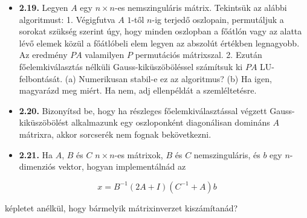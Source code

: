 \documentclass[
  magyar,
  11pt]{article}
\providecommand{\tightlist}{%
  \setlength{\itemsep}{0pt}\setlength{\parskip}{0pt}}
\begin{document}
\begin{itemize}
\tightlist
\item
  \textbf{2.19.} Legyen \(A\) egy \(n \times n\)-es nemszinguláris
  mátrix. Tekintsük az alábbi algoritmust: 1. Végigfutva \(A\) \(1\)-től
  \(n\)-ig terjedő oszlopain, permutáljuk a sorokat szükség szerint úgy,
  hogy minden oszlopban a főátlón vagy az alatta lévő elemek közül a
  főátlóbeli elem legyen az abszolút értékben legnagyobb. Az eredmény
  \(PA\) valamilyen \(P\) permutációs mátrixszal. 2. Ezután
  főelemkiválasztás nélküli Gauss-kiküszöböléssel számítsuk ki \(PA\)
  LU-felbontását. (a) Numerikusan stabil-e ez az algoritmus? (b) Ha
  igen, magyarázd meg miért. Ha nem, adj ellenpéldát a szemléltetésre.
\item
  \textbf{2.20.} Bizonyítsd be, hogy ha részleges főelemkiválasztással
  végzett Gauss-kiküszöbölést alkalmazunk egy oszloponként diagonálisan
  domináns \(A\) mátrixra, akkor sorcserék nem fognak bekövetkezni.
\item
  \textbf{2.21.} Ha \(A\), \(B\) és \(C\) \(n \times n\)-es mátrixok,
  \(B\) és \(C\) nemszinguláris, és \(b\) egy \(n\)-dimenziós vektor,
  hogyan implementálnád az
\end{itemize}

\[x = B^{-1}(2A + I)(C^{-1} + A)b\]

képletet anélkül, hogy bármelyik mátrixinverzet kiszámítanád?
\end{document}
